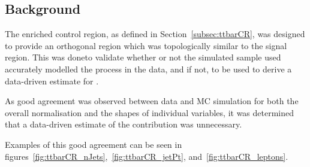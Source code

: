 \subsection{\ttbar Background}\label{subsec:ttbarEstimation}
The \ttbar enriched control region, as defined in Section~\ref{subsec:ttbarCR}, was designed to provide an orthogonal region which was topologically similar to the signal region.
This was doneto validate whether or not the simulated \ttbar sample used accurately modelled the \ttbar process in the data, and if not, to be used to derive a data-driven estimate for \ttbar.

As good agreement was observed between data and MC simulation for both the overall normalisation and the shapes of individual variables, it was determined that a data-driven estimate of the \ttbar contribution was unnecessary.

Examples of this good agreement can be seen in figures~\ref{fig:ttbarCR_nJets},~\ref{fig:ttbarCR_jetPt}, and~\ref{fig:ttbarCR_leptons}.

